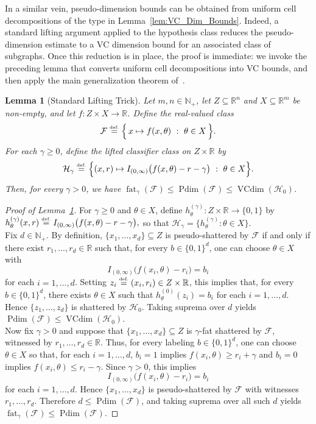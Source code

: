 \documentclass{article}
\newcommand{\eqdef}{\ensuremath{\stackrel{\mbox{\upshape\tiny def.}}{=}}}
\theoremstyle{plain}
\newtheorem{lemma}[theorem]{Lemma}
\theoremstyle{definition}
\theoremstyle{remark}
\theoremstyle{plain}
\numberwithin{thm}{section}
\theoremstyle{definition}
\numberwithin{equation}{section}
\begin{document}
In a similar vein, pseudo-dimension bounds can be obtained from uniform cell decompositions of the type in Lemma~\ref{lem:VC_Dim_Bounds}.
Indeed, a standard lifting argument applied to the hypothesis class reduces the pseudo-dimension estimate to a VC dimension bound for an associated class of subgraphs. Once this reduction is in place, the proof is immediate: we invoke the preceding lemma that converts uniform cell decompositions into VC bounds, and then apply the main generalization theorem of~\cite{AlonBenDavidCesaBianchiHaussler_PDGeneralization}.  
\begin{lemma}[Standard Lifting Trick]
\label{lem:pdim_fat_via_lift}
Let $m,n\in\mathbb{N}_+$, let $Z\subseteq \mathbb{R}^n$ and $X\subseteq \mathbb{R}^m$ be non-empty, and let
$f:Z\times X\to\mathbb{R}$.
Define the real-valued class
\[
\mathcal{F}\eqdef \Big\{\,x\mapsto f(x,\theta)\ :\ \theta\in X\,\Big\}.
\]
For each $\gamma\ge 0$, define the lifted classifier class on $Z\times\mathbb{R}$ by
\[
\mathcal{H}_\gamma
\eqdef
\Big\{
(x,r)\mapsto I_{(0,\infty)}\big(f(x,\theta)-r-\gamma\big)
\ :\ \theta\in X
\Big\}.
\]
Then, for every $\gamma>0$, we have
$
    \operatorname{fat}_\gamma(\mathcal{F})
    \le
    \operatorname{Pdim}(\mathcal{F})
    \le 
    \operatorname{VCdim}(\mathcal{H}_0)
$.
\end{lemma}
\begin{proof}[Proof of Lemma~\ref{lem:pdim_fat_via_lift}]
For $\gamma\ge 0$ and $\theta\in X$, define
$
h_{\theta}^{(\gamma)}:Z\times\mathbb{R}\to\{0,1\}
$
by
$
h_{\theta}^{(\gamma)}(x,r)\eqdef I_{(0,\infty)}\big(f(x,\theta)-r-\gamma\big),
$
so that $\mathcal{H}_\gamma=\{h_{\theta}^{(\gamma)}:\theta\in X\}$.
\hfill\\
\noindent
Fix $d\in\mathbb{N}_+$.  By definition, $\{x_1,\dots,x_d\}\subseteq Z$ is pseudo-shattered by $\mathcal{F}$ if and only if there exist
$r_1,\dots,r_d\in\mathbb{R}$ such that, for every $b\in\{0,1\}^d$, one can choose $\theta\in X$ with
\[
    I_{(0,\infty)}\big(f(x_i,\theta)-r_i\big)=b_i
\]
for each $i=1,\dots,d$.
Setting $z_i\eqdef (x_i,r_i)\in Z\times\mathbb{R}$, this implies that, for every $b\in\{0,1\}^d$, there exists $\theta\in X$ such that
$
    h_{\theta}^{(0)}(z_i)=b_i
$
for each $i=1,\dots,d$.  Hence $\{z_1,\dots,z_d\}$ is shattered by $\mathcal{H}_0$.  Taking suprema over $d$ yields
$
    \operatorname{Pdim}(\mathcal{F})\le \operatorname{VCdim}(\mathcal{H}_0)
$.
\hfill\\
\noindent
Now fix $\gamma>0$ and suppose that $\{x_1,\dots,x_d\}\subseteq Z$ is $\gamma$-fat shattered by $\mathcal{F}$, witnessed by
$r_1,\dots,r_d\in\mathbb{R}$.  Thus, for every labeling $b\in\{0,1\}^d$, one can choose $\theta\in X$ so that, for each
$i=1,\dots,d$,
$
b_i=1
$
implies
$
f(x_i,\theta)\ge r_i+\gamma
$
and
$
b_i=0
$
implies
$
f(x_i,\theta)\le r_i-\gamma.
$
Since $\gamma>0$, this implies
\[
    I_{(0,\infty)}\big(f(x_i,\theta)-r_i\big)=b_i
\]
for each $i=1,\dots,d$.  Hence $\{x_1,\dots,x_d\}$ is pseudo-shattered by $\mathcal{F}$ with witnesses
$r_1,\dots,r_d$.  Therefore $d\le \operatorname{Pdim}(\mathcal{F})$, and taking suprema over all such $d$ yields
$
    \operatorname{fat}_\gamma(\mathcal{F})\le \operatorname{Pdim}(\mathcal{F})
$.
\end{proof}
\end{document}
